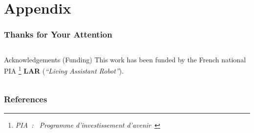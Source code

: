 \documentclass[10pt,c]{beamer}
\begin{document}

\appendix


\section{Appendix}

\begin{frame}[b]
\frametitle{Thanks for Your Attention}
\begin{block}{}
\end{block}
\vspace{1.25cm}
\begin{columns}[c]
\begin{column}{8cm}
\begin{block}{\small Acknowledgements (Funding)}
\small
This work has been funded by the French national PIA
\footnote{\scriptsize\textsl{PIA~: \guillemotleft~Programme
d'investissement d'avenir~\guillemotright}}
\textbf{LAR} (\textit{``Living Assistant Robot''}).
\end{block}
\end{column}
\end{columns}
\vspace{0.3cm}
\end{frame}

\begin{frame}[t]
\frametitle{References}
\tiny


\end{frame}




\end{document}

